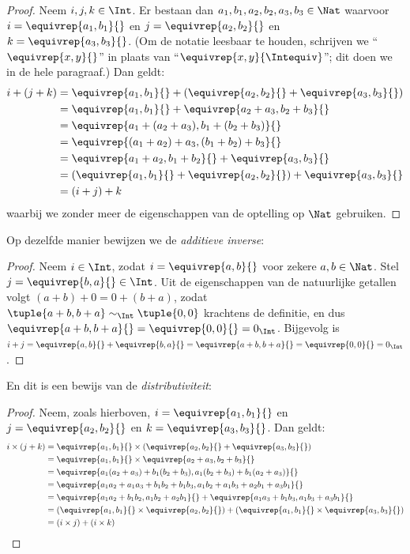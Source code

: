 \documentclass[../../../include/open-logic-section]{subfiles}
\begin{document}
\begin{proof} 
Neem $i, j, k \in \Int$. Er bestaan dan $a_1, b_1, a_2, b_2, a_3, b_3 \in
\Nat$ waarvoor $i = \equivrep{a_1, b_1}{}$ en $j =
\equivrep{a_2,b_2}{}$ en $k = \equivrep{a_3, b_3}{}$. (Om de
notatie leesbaar te houden, schrijven we ``$\equivrep{x, y}{}$'' in plaats van
``$\equivrep{x, y}{\Intequiv}$''; dit doen we in de hele
paragraaf.) Dan geldt:
\begin{align*}
	i + (j + k) &= \equivrep{a_1, b_1}{}+(\equivrep{a_2, b_2}{} + \equivrep{a_3, b_3}{}) \\
	&= \equivrep{a_1,  b_1}{} + \equivrep{a_2+a_3, b_2+b_3}{}\\
	&= \equivrep{a_1 + (a_2 + a_3), b_1 + (b_2 + b_3)}{}\\
	&= \equivrep{(a_1 + a_2) + a_3, (b_1 + b_2) + b_3}{}\\
	&= \equivrep{a_1 + a_2, b_1 + b_2}{} + \equivrep{a_3, b_3}{}\\
	&= (\equivrep{a_1, b_1}{} + \equivrep{a_2, b_2}{}) + \equivrep{a_3, b_3}{}\\
	&= (i+j) + k
\end{align*}
waarbij we zonder meer de eigenschappen van de optelling op $\Nat$
gebruiken.
\end{proof}
Op dezelfde manier bewijzen we de \emph{additieve inverse}:
\begin{proof}
Neem $i \in \Int$, zodat $i = \equivrep{a,b}{}$ voor zekere $a,b \in
\Nat$. Stel $j = \equivrep{b,a}{} \in \Int$. Uit de eigenschappen van
de natuurlijke getallen volgt $(a+b) + 0 = 0 + (b+a)$, zodat
$\tuple{a+b, b+a} \sim_\Int \tuple{0,0}$ krachtens de definitie, en dus
$\equivrep{a+b, b+a}{} = \equivrep{0, 0}{} = 0_\Int$. Bijgevolg is $i + j =
\equivrep{a,b}{}+\equivrep{b,a}{}=\equivrep{a+b, b+a}{}= \equivrep{0,
0}{} = 0_\Int$.
\end{proof}
En dit is een bewijs van de \emph{distributiviteit}:
\begin{proof}
Neem, zoals hierboven, $i = \equivrep{a_1, b_1}{}$ en $j =
\equivrep{a_2,b_2}{}$ en $k = \equivrep{a_3, b_3}{}$. Dan geldt:
\begin{align*}
	i \times (j + k) 
	&= \equivrep{a_1, b_1}{} \times (\equivrep{a_2,b_2}{} + \equivrep{a_3, b_3}{})\\
	&= \equivrep{a_1, b_1}{} \times \equivrep{a_2 + a_3,b_2+b_3}{}\\
	&= \equivrep{a_1  (a_2 + a_3) + b_1  (b_2+b_3), a_1  (b_2 + b_3) + b_1 (a_2 + a_3)}{}\\
	&= \equivrep{a_1 a_2 + a_1a_3 + b_1 b_2+b_1b_3, a_1 b_2 + a_1b_3 + a_2b_1 + a_3b_1}{}\\		
	&= \equivrep{a_1a_2 + b_1b_2, a_1b_2 + a_2b_1}{} + \equivrep{a_1a_3 + b_1b_3, a_1b_3 + a_3b_1}{}\\
	&= (\equivrep{a_1, b_1}{} \times \equivrep{a_2,b_2}{}) + (\equivrep{a_1, b_1}{} \times  \equivrep{a_3, b_3}{})\\
	&= (i \times j) + (i \times k)
\end{align*}
\end{proof}
\end{document}
